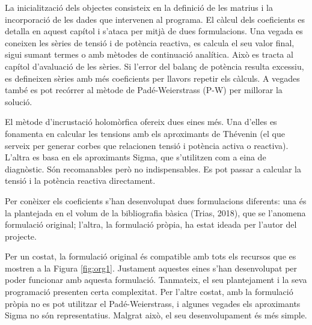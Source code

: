 La inicialització dels objectes consisteix en la definició de les matrius i la incorporació de les dades que intervenen al programa. El càlcul dels coeficients es detalla en aquest capítol i s'ataca per mitjà de dues formulacions. Una vegada es coneixen les sèries de tensió i de potència reactiva, es calcula el seu valor final, sigui sumant termes o amb mètodes de continuació analítica. Això es tracta al capítol d'avaluació de les sèries. Si l'error del balanç de potència resulta excessiu, es defineixen sèries amb més coeficients per llavors repetir els càlculs. A vegades també es pot recórrer al mètode de Padé-Weierstrass (P-W) per millorar la solució.

El mètode d'incrustació holomòrfica ofereix dues eines més. Una d'elles es fonamenta en calcular les tensions amb els aproximants de Thévenin (el que serveix per generar corbes que relacionen tensió i potència activa o reactiva). L'altra es basa en els aproximants Sigma, que s'utilitzen com a eina de diagnòstic. Són recomanables però no indispensables. Es pot passar a calcular la tensió i la potència reactiva directament.

Per conèixer els coeficients s'han desenvolupat dues formulacions diferents: una és la plantejada en el volum de la bibliografia bàsica (Trias, 2018), que se l'anomena formulació original; l'altra, la formulació pròpia, ha estat ideada per l'autor del projecte. 

Per un costat, la formulació original és compatible amb tots els recursos que es mostren a la Figura \ref{fig:org1}. Justament aquestes eines s'han desenvolupat per poder funcionar amb aquesta formulació. Tanmateix, el seu plantejament i la seva programació presenten certa complexitat. Per l'altre costat, amb la formulació pròpia no es pot utilitzar el Padé-Weierstrass, i algunes vegades els aproximants Sigma no són representatius. Malgrat això, el seu desenvolupament és més simple. 



